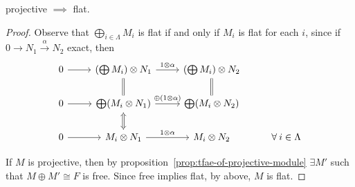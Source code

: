 \begin{prop}
  projective $\implies$ flat.
  \begin{proof}
    Observe that $\bigoplus\limits_{i \in \Lambda} M_i$ is flat if and only if $M_i$ is
    flat for each $i$, since if $0 \to N_1 \xrightarrow{\alpha} N_2$ exact, then
    \[
      \begin{tikzcd} [cong/.style = {draw=none, "\cong" description, sloped}]
        0 \ar[r] & \left( \bigoplus M_i \right) \otimes N_1
        \ar[r, "1 \otimes \alpha"] \ar[d,equal] &
        \left(\bigoplus M_i \right) \otimes N_2 \ar[d, equal] \\
        0 \ar[r] & \bigoplus (M_i \otimes N_1)
        \ar[r, "\oplus (1 \otimes \alpha)"] \ar[d, Leftrightarrow]& 
        \bigoplus (M_i \otimes N_2)\\
        0 \ar[r] & M_i \otimes N_1 \ar[r, "1 \otimes \alpha"] 
        & M_i \otimes N_2 & \forall i \in \Lambda 
      \end{tikzcd}
    \]

    If $M$ is projective, then by proposition~\ref{prop:tfae-of-projective-module}
    $\exists M'$ such that $M \oplus M' \cong F$ is free.
    Since free implies flat, by above, $M$ is flat.
  \end{proof}
\end{prop}


